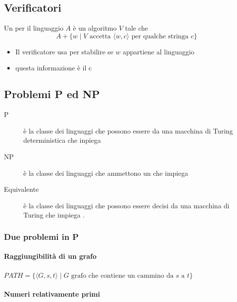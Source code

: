 
\subsection{Verificatori}
\begin{definition}
  Un  per il linguaggio $A$ è un algoritmo $V$ tale che 
  \begin{displaymath}
    A+\{w\mid V\textrm{ accetta } \langle w,c\rangle\textrm{ per qualche stringa }c\}
  \end{displaymath}
\end{definition}
\begin{itemize}
  \item Il verificatore usa  per stabilire se $w$ appartiene 
    al linguaggio
  \item questa informazione è il  c
\end{itemize}
\subsection{Problemi P ed NP} 
\begin{description}
  \item [P] è la classe dei linguaggi che possono essere  da una 
    macchina di Turing deterministica che inpiega 
  \item [NP] è la classe dei linguaggi che ammettono un 
    che impiega 
  \item [Equivalente] è la classe dei linguaggi che possono essere decisi da una macchina 
    di Turing  che impiega .
\end{description}
\subsubsection{Due problemi in P}
\paragraph{Raggiungibilità di un grafo}\nin

$PATH=\{\langle G,s,t\rangle\mid G \textrm{ grafo che contiene un cammino da } s \textrm{ a }t\}$
\paragraph{Numeri relativamente primi}\nin

